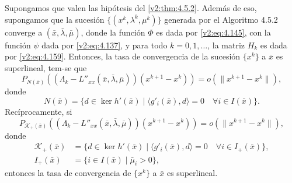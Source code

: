 \begin{theorem}\label{v2:thm:4.5.3}
    Supongamos que valen las hipótesis del \cref{v2:thm:4.5.2}. Además de eso, supongamos que la sucesión $\{(x^k, \lambda^k, \mu^k)\}$ generada por el Algoritmo 4.5.2 converge a $(\bar{x}, \bar{\lambda}, \bar{\mu})$, donde la función $\Phi$ es dada por \eqref{v2:eq:4.145}, con la función $\psi$ dada por \eqref{v2:eq:4.137}, y para todo $k = 0, 1, \dots$, la matriz $H_k$ es dada por \eqref{v2:eq:4.159}.
    Entonces, la tasa de convergencia de la sucesión $\{x^k\}$ a $\bar{x}$ es superlineal, tem-se que
    \begin{equation}
        P_{N(\bar{x})} \left( (\Lambda_k - L''_{xx}(\bar{x}, \bar{\lambda}, \bar{\mu}))(x^{k+1} - x^k) \right) = o(\|x^{k+1} - x^k\|),
        \label{v2:eq:4.160}
    \end{equation}
    donde
    \[
        N(\bar{x}) = \{d \in \ker h'(\bar{x}) \mid \langle g'_i(\bar{x}), d \rangle = 0 \quad \forall i \in I(\bar{x})\}.
    \]
    Recíprocamente, si
    \begin{equation}
        P_{\mathcal{K}_+(\bar{x})} \left( (\Lambda_k - L''_{xx}(\bar{x}, \bar{\lambda}, \bar{\mu}))(x^{k+1} - x^k) \right) = o(\|x^{k+1} - x^k\|),
        \label{v2:eq:4.161}
    \end{equation}
    donde
    \begin{align*}
        \mathcal{K}_+(\bar{x}) &= \{d \in \ker h'(\bar{x}) \mid \langle g'_i(\bar{x}), d \rangle = 0 \quad \forall i \in I_+(\bar{x})\}, \\
        I_+(\bar{x}) &= \{i \in I(\bar{x}) \mid \bar{\mu}_i > 0\},
    \end{align*}
    entonces la tasa de convergencia de $\{x^k\}$ a $\bar{x}$ es superlineal.
\end{theorem}
